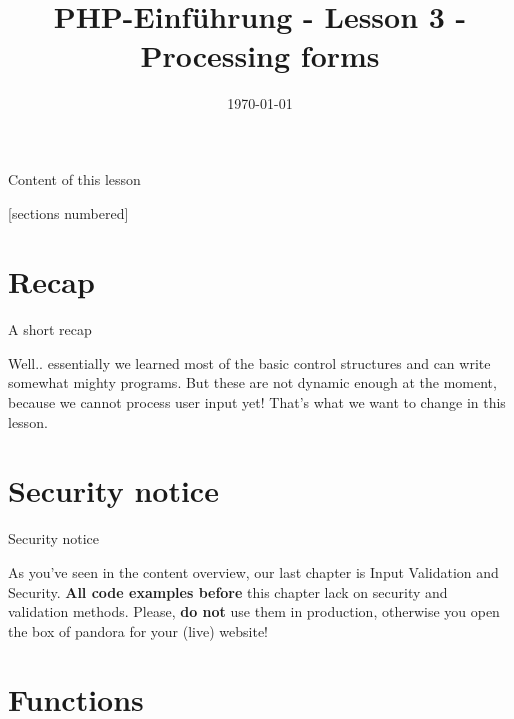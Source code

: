 


\newcommand{\topic}{
	PHP-Einführung - Lesson 3 - Processing forms
}

\title{\topic}
\date{\today}



\maketitle

\begin{frame}{Content of this lesson}

	[sections numbered]
	\tableofcontents

\end{frame}

\section{Recap}

\begin{frame}{A short recap}

	Well.. essentially we learned most of the basic control structures and can write somewhat mighty programs. \pause But these are not dynamic enough at the moment, because we cannot process user input yet! That's what we want to change in this lesson.
\end{frame}

\section{Security notice}

\begin{frame}{Security notice}

	As you've seen in the content overview, our last chapter is Input Validation and Security. \textbf{All code examples before} this chapter lack on security and validation methods. \pause 
	Please, \textbf{do not} use them in production, otherwise you open the box of pandora for your (live) website!
\end{frame}

\section{Functions}

